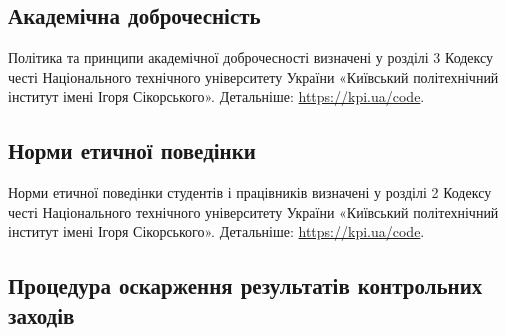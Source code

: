 \documentclass{Syllabus}
\begin{document}



\subsection*{Академічна доброчесність}

Політика та принципи академічної доброчесності визначені у розділі 3 Кодексу честі Національного технічного університету України «Київський політехнічний інститут імені Ігоря Сікорського». Детальніше: \url{https://kpi.ua/code}.

\subsection*{Норми етичної поведінки}

Норми етичної поведінки студентів і працівників визначені у розділі 2 Кодексу честі Національного технічного університету України «Київський політехнічний інститут імені Ігоря Сікорського». Детальніше: \url{https://kpi.ua/code}.

\subsection*{Процедура оскарження результатів контрольних заходів}
\end{document}
